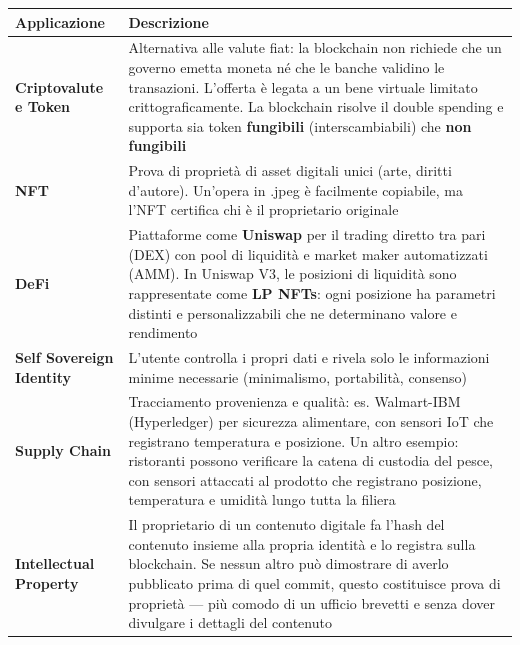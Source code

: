 \documentclass[
  italian,
  openany]{book}
\newcounter{none} %
\begin{document}
{\def\LTcaptype{none} %
\begin{longtable}[]{@{}
  >{\raggedright\arraybackslash}p{}
  >{\raggedright\arraybackslash}p{}@{}}
\toprule\noalign{}
\begin{minipage}[b]{\linewidth}\raggedright
Applicazione
\end{minipage} & \begin{minipage}[b]{\linewidth}\raggedright
Descrizione
\end{minipage} \\
\midrule\noalign{}
\endhead
\bottomrule\noalign{}
\endlastfoot
\textbf{Criptovalute e Token} & Alternativa alle valute fiat: la
blockchain non richiede che un governo emetta moneta né che le banche
validino le transazioni. L'offerta è legata a un bene virtuale limitato
crittograficamente. La blockchain risolve il double spending e supporta
sia token \textbf{fungibili} (interscambiabili) che \textbf{non
fungibili} \\
\textbf{NFT} & Prova di proprietà di asset digitali unici (arte, diritti
d'autore). Un'opera in .jpeg è facilmente copiabile, ma l'NFT certifica
chi è il proprietario originale \\
\textbf{DeFi} & Piattaforme come \textbf{Uniswap} per il trading diretto
tra pari (DEX) con pool di liquidità e market maker automatizzati (AMM).
In Uniswap V3, le posizioni di liquidità sono rappresentate come
\textbf{LP NFTs}: ogni posizione ha parametri distinti e
personalizzabili che ne determinano valore e rendimento \\
\textbf{Self Sovereign Identity} & L'utente controlla i propri dati e
rivela solo le informazioni minime necessarie (minimalismo, portabilità,
consenso) \\
\textbf{Supply Chain} & Tracciamento provenienza e qualità: es.
Walmart-IBM (Hyperledger) per sicurezza alimentare, con sensori IoT che
registrano temperatura e posizione. Un altro esempio: ristoranti possono
verificare la catena di custodia del pesce, con sensori attaccati al
prodotto che registrano posizione, temperatura e umidità lungo tutta la
filiera \\
\textbf{Intellectual Property} & Il proprietario di un contenuto
digitale fa l'hash del contenuto insieme alla propria identità e lo
registra sulla blockchain. Se nessun altro può dimostrare di averlo
pubblicato prima di quel commit, questo costituisce prova di proprietà
--- più comodo di un ufficio brevetti e senza dover divulgare i dettagli
del contenuto \\
\end{longtable}
}
\end{document}
